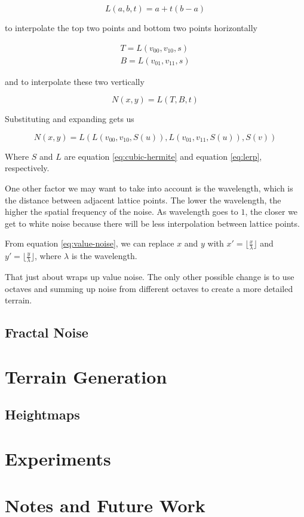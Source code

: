 \documentclass[11pt]{article}
\begin{document}
\begin{equation}
    L(a,b,t)=a+t(b-a)
    \label{eq:lerp}
\end{equation}

to interpolate the top two points and bottom two points horizontally

\begin{align*}
    T=L(v_{00}, v_{10}, s) \\
    B=L(v_{01}, v_{11}, s)
\end{align*}

and to interpolate these two vertically

\[
    N(x, y) = L(T, B, t)
\]

Substituting and expanding gets us

\begin{equation}
    N(x, y) = L(L(v_{00}, v_{10}, S(u)), L(v_{01}, v_{11}, S(u)), S(v))
    \label{eq:value-noise}
\end{equation}

Where $S$ and $L$ are equation \ref{eq:cubic-hermite} and equation \ref{eq:lerp}, respectively.

One other factor we may want to take into account is the wavelength, which is the distance between adjacent lattice points. The lower the wavelength, the higher the spatial frequency of the noise. As wavelength goes to $1$, the closer we get to white noise because there will be less interpolation between lattice points.

From equation \ref{eq:value-noise}, we can replace $x$ and $y$ with $x' = \lfloor \frac{x}{\lambda} \rfloor$ and $y' = \lfloor \frac{y}{\lambda} \rfloor$, where $\lambda$ is the wavelength.

That just about wraps up value noise. The only other possible change is to use octaves and summing up noise from different octaves to create a more detailed terrain.

\subsection{Fractal Noise}

\section{Terrain Generation}

\subsection{Heightmaps}

\section{Experiments}

\section{Notes and Future Work}
\end{document}
